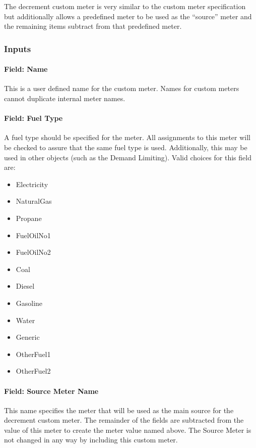 The decrement custom meter is very similar to the custom meter specification but additionally allows a predefined meter to be used as the ``source'' meter and the remaining items subtract from that predefined meter.

\subsubsection{Inputs}\label{inputs-18-008}

\paragraph{Field: Name}\label{field-name-1-040}

This is a user defined name for the custom meter. Names for custom meters cannot duplicate internal meter names.

\paragraph{Field: Fuel Type}\label{field-fuel-type-1-003}

A fuel type should be specified for the meter. All assignments to this meter will be checked to assure that the same fuel type is used. Additionally, this may be used in other objects (such as the Demand Limiting). Valid choices for this field are:

\begin{itemize}
\item
  Electricity
\item
  NaturalGas
\item
  Propane
\item
  FuelOilNo1
\item
  FuelOilNo2
\item
  Coal
\item
  Diesel
\item
  Gasoline
\item
  Water
\item
  Generic
\item
  OtherFuel1
\item
  OtherFuel2
\end{itemize}

\paragraph{Field: Source Meter Name}\label{field-source-meter-name}

This name specifies the meter that will be used as the main source for the decrement custom meter. The remainder of the fields are subtracted from the value of this meter to create the meter value named above. The Source Meter is not changed in any way by including this custom meter.

